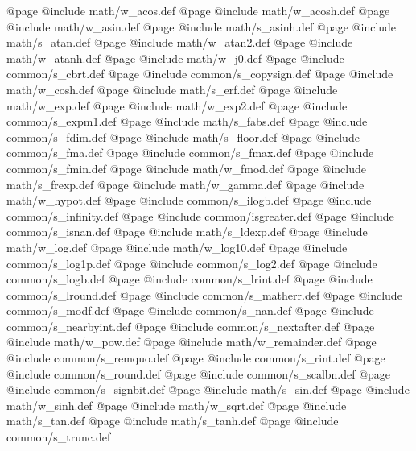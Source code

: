 @page
@include   math/w_acos.def
@page
@include   math/w_acosh.def
@page
@include   math/w_asin.def
@page
@include   math/s_asinh.def
@page
@include   math/s_atan.def
@page
@include   math/w_atan2.def
@page
@include   math/w_atanh.def
@page
@include   math/w_j0.def
@page
@include common/s_cbrt.def
@page
@include common/s_copysign.def
@page
@include   math/w_cosh.def
@page
@include   math/s_erf.def
@page
@include   math/w_exp.def
@page
@include   math/w_exp2.def
@page
@include common/s_expm1.def
@page
@include   math/s_fabs.def
@page
@include common/s_fdim.def
@page
@include   math/s_floor.def
@page
@include common/s_fma.def
@page
@include common/s_fmax.def
@page
@include common/s_fmin.def
@page
@include   math/w_fmod.def
@page
@include   math/s_frexp.def
@page
@include   math/w_gamma.def
@page
@include   math/w_hypot.def
@page
@include common/s_ilogb.def
@page
@include common/s_infinity.def
@page
@include   common/isgreater.def
@page
@include common/s_isnan.def
@page
@include   math/s_ldexp.def
@page
@include   math/w_log.def
@page
@include   math/w_log10.def
@page
@include common/s_log1p.def
@page
@include common/s_log2.def
@page
@include common/s_logb.def
@page
@include common/s_lrint.def
@page
@include common/s_lround.def
@page
@include common/s_matherr.def
@page
@include common/s_modf.def
@page
@include common/s_nan.def
@page
@include common/s_nearbyint.def
@page
@include common/s_nextafter.def
@page
@include   math/w_pow.def
@page
@include   math/w_remainder.def
@page
@include common/s_remquo.def
@page
@include common/s_rint.def
@page
@include common/s_round.def
@page
@include common/s_scalbn.def
@page
@include common/s_signbit.def
@page
@include   math/s_sin.def
@page
@include   math/w_sinh.def
@page
@include   math/w_sqrt.def
@page
@include   math/s_tan.def
@page
@include   math/s_tanh.def
@page
@include common/s_trunc.def
